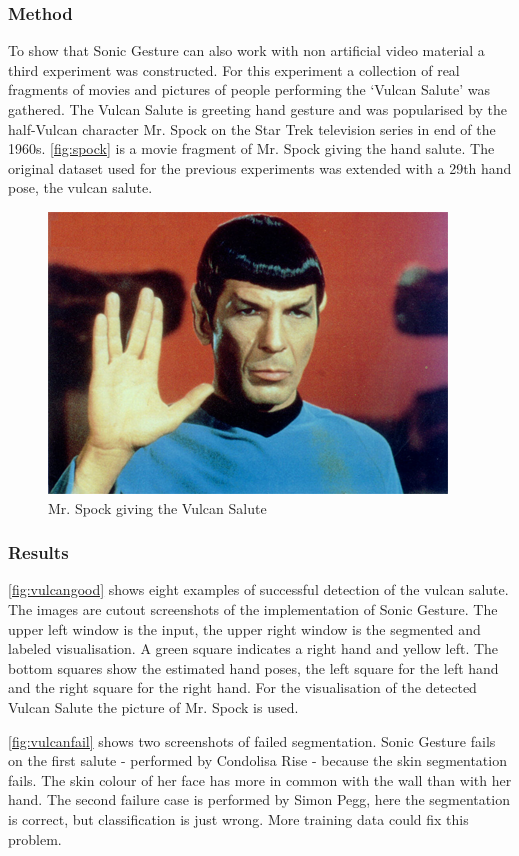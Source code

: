 \subsubsection{Method}
To show that Sonic Gesture can also work with non artificial video material a third experiment was constructed. For this experiment a collection of real fragments of movies and pictures of people performing the `Vulcan Salute' was gathered. The Vulcan Salute is greeting hand gesture and was popularised by the half-Vulcan character Mr. Spock on the Star Trek television series in end of the 1960s. \autoref{fig:spock} is a movie fragment of Mr. Spock giving the hand salute. The original dataset used for the previous experiments was extended with a 29th hand pose, the vulcan salute. 

\begin{figure}[tb]
\centering{}
\includegraphics[width=0.6\linewidth]{figures/spock/salute.png}
\caption{Mr. Spock giving the Vulcan Salute}
\label{fig:spock}
\end{figure}


\subsubsection{Results}
\autoref{fig:vulcangood} shows eight examples of successful detection of the vulcan salute. The images are cutout screenshots of the implementation of Sonic Gesture. The upper left window is the input, the upper right window is the segmented and labeled visualisation. A green square indicates a right hand and yellow left. The bottom squares show the estimated hand poses, the left square for the left hand and the right square for the right hand. For the visualisation of the detected Vulcan Salute the picture of Mr. Spock is used.

\autoref{fig:vulcanfail} shows two screenshots of failed segmentation. Sonic Gesture fails on the first salute - performed by Condolisa Rise - because the skin segmentation fails. The skin colour of her face has more in common with the wall than with her hand. The second failure case is performed by Simon Pegg, here the segmentation is correct, but classification is just wrong. More training data could fix this problem.

